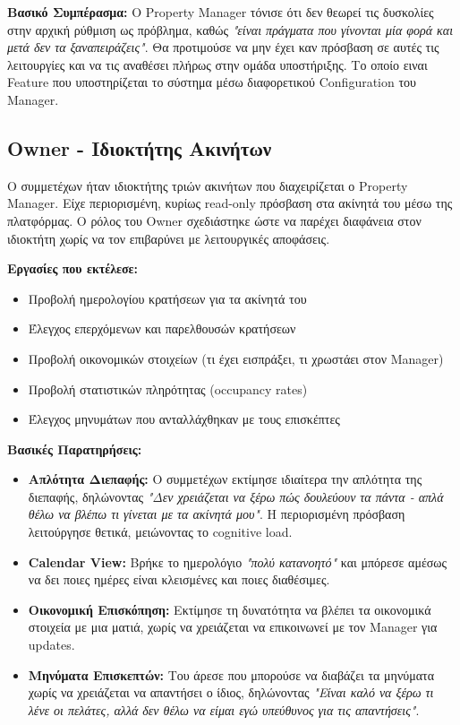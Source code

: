 \documentclass[
	12pt, %
	oneside, %
	greek,
	onehalfspacing, %
	liststotoc, %
	toctotoc, %
	parskip, %
	headsepline, %
]{MastersDoctoralThesis} %
\begin{document}
\textbf{Βασικό Συμπέρασμα:} Ο Property Manager τόνισε ότι δεν θεωρεί τις δυσκολίες στην αρχική ρύθμιση ως πρόβλημα, καθώς \textit{"είναι πράγματα που γίνονται μία φορά και μετά δεν τα ξαναπειράζεις"}. Θα προτιμούσε να μην έχει καν πρόσβαση σε αυτές τις λειτουργίες και να τις αναθέσει πλήρως στην ομάδα υποστήριξης. Το οποίο ειναι Feature που υποστηρίζεται το σύστημα μέσω διαφορετικού Configuration του Manager.

\subsection{Owner - Ιδιοκτήτης Ακινήτων}

Ο συμμετέχων ήταν ιδιοκτήτης τριών ακινήτων που διαχειρίζεται ο Property Manager. Είχε περιορισμένη, κυρίως read-only πρόσβαση στα ακίνητά του μέσω της πλατφόρμας. Ο ρόλος του Owner σχεδιάστηκε ώστε να παρέχει διαφάνεια στον ιδιοκτήτη χωρίς να τον επιβαρύνει με λειτουργικές αποφάσεις.

\textbf{Εργασίες που εκτέλεσε:}
\begin{itemize}
    \item Προβολή ημερολογίου κρατήσεων για τα ακίνητά του
    \item Έλεγχος επερχόμενων και παρελθουσών κρατήσεων
    \item Προβολή οικονομικών στοιχείων (τι έχει εισπράξει, τι χρωστάει στον Manager)
    \item Προβολή στατιστικών πληρότητας (occupancy rates)
    \item Έλεγχος μηνυμάτων που ανταλλάχθηκαν με τους επισκέπτες
\end{itemize}

\textbf{Βασικές Παρατηρήσεις:}
\begin{itemize}
    \item \textbf{Απλότητα Διεπαφής:} Ο συμμετέχων εκτίμησε ιδιαίτερα την απλότητα της διεπαφής, δηλώνοντας \textit{"Δεν χρειάζεται να ξέρω πώς δουλεύουν τα πάντα - απλά θέλω να βλέπω τι γίνεται με τα ακίνητά μου"}. Η περιορισμένη πρόσβαση λειτούργησε θετικά, μειώνοντας το cognitive load.
    \item \textbf{Calendar View:} Βρήκε το ημερολόγιο \textit{"πολύ κατανοητό"} και μπόρεσε αμέσως να δει ποιες ημέρες είναι κλεισμένες και ποιες διαθέσιμες.
    \item \textbf{Οικονομική Επισκόπηση:} Εκτίμησε τη δυνατότητα να βλέπει τα οικονομικά στοιχεία με μια ματιά, χωρίς να χρειάζεται να επικοινωνεί με τον Manager για updates.
    \item \textbf{Μηνύματα Επισκεπτών:} Του άρεσε που μπορούσε να διαβάζει τα μηνύματα χωρίς να χρειάζεται να απαντήσει ο ίδιος, δηλώνοντας \textit{"Είναι καλό να ξέρω τι λένε οι πελάτες, αλλά δεν θέλω να είμαι εγώ υπεύθυνος για τις απαντήσεις"}.
\end{itemize}
\end{document}

